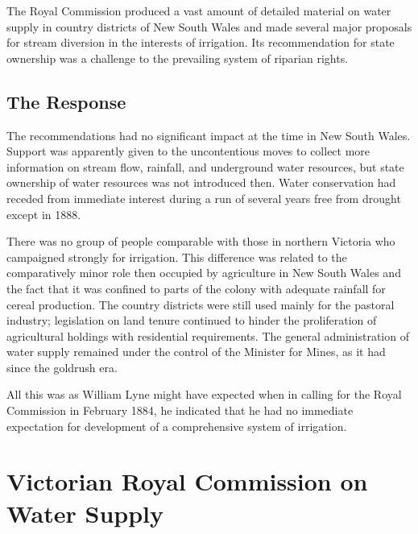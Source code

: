The Royal Commission produced a vast amount of detailed material on
water supply in country districts of New South Wales and made several
major proposals for stream diversion in the interests of irrigation.
Its recommendation for state ownership was a challenge to the
prevailing system of riparian rights.

\subsection*{The Response}

The recommendations had no significant impact at the time in New South
Wales.  Support was apparently given to the uncontentious moves to
collect more information on stream flow, rainfall, and underground
water resources, but state ownership of water resources was not
introduced then.  Water conservation had receded from immediate
interest during a run of several years free from drought except in
1888.

There was no group of people comparable with those in northern
Victoria who campaigned strongly for irrigation.  This difference was
related to the comparatively minor role then occupied by agriculture
in New South Wales and the fact that it was confined to parts of the
colony with adequate rainfall for cereal production.  The country
districts were still used mainly for the pastoral industry;
legislation on land tenure continued to hinder the proliferation of
agricultural holdings with residential requirements.  The general
administration of water supply remained under the control of the
Minister for Mines, as it had since the goldrush era.

All this was as William Lyne might have expected when in calling for
the Royal Commission in February 1884, he indicated that he had no
immediate expectation for development of a comprehensive system of
irrigation.

\section*{Victorian Royal Commission on Water Supply}

